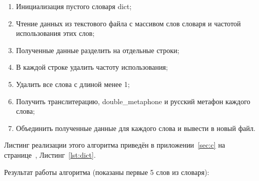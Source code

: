 \begin{enumerate}
  \item Инициализация пустого словаря dict;
  \item Чтение данных из текстового файла с массивом слов словаря и частотой использования этих слов;
  \item Полученные данные разделить на отдельные строки;
  \item В каждой строке удалить частоту использования;
  \item Удалить все слова с длиной менее 1;
  \item Получить транслитерацию, double\_metaphone и русский метафон каждого слова;
  \item Объединить полученные данные для каждого слова и вывести в новый файл.
\end{enumerate}

Листинг реализации этого алгоритма приведён в приложении~\ref{sec:c} на странице~\pageref{lst:dict}, Листинг~\ref{lst:dict}.

Результат работы алгоритма (показаны первые 5 слов из словаря):

